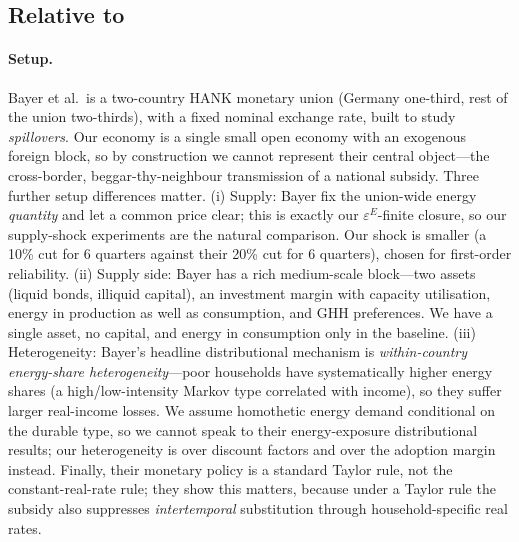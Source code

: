 \documentclass[11pt,a4paper]{article}
\begin{document}
\subsection{Relative to \citet{Bayer2026}}

\paragraph{Setup.} Bayer et al.\ is a two-country HANK monetary union (Germany
one-third, rest of the union two-thirds), with a fixed nominal exchange rate,
built to study \emph{spillovers}. Our economy is a single small open economy
with an exogenous foreign block, so by construction we cannot represent their
central object---the cross-border, beggar-thy-neighbour transmission of a
national subsidy. Three further setup differences matter. (i) Supply: Bayer
fix the union-wide energy \emph{quantity} and let a common price clear; this is
exactly our $\varepsilon^E$-finite closure, so our supply-shock experiments are
the natural comparison. Our shock is smaller (a 10\% cut for 6 quarters against
their 20\% cut for 6 quarters), chosen for first-order reliability. (ii) Supply
side: Bayer has a rich medium-scale block---two assets (liquid bonds, illiquid
capital), an investment margin with capacity utilisation, energy in production
as well as consumption, and GHH preferences. We have a single asset, no
capital, and energy in consumption only in the baseline. (iii) Heterogeneity:
Bayer's headline distributional mechanism is \emph{within-country
energy-share heterogeneity}---poor households have systematically higher energy
shares (a high/low-intensity Markov type correlated with income), so they
suffer larger real-income losses. We assume homothetic energy demand
conditional on the durable type, so we cannot speak to their energy-exposure
distributional results; our heterogeneity is over discount factors and over the
adoption margin instead. Finally, their monetary policy is a standard Taylor
rule, not the constant-real-rate rule; they show this matters, because under a
Taylor rule the subsidy also suppresses \emph{intertemporal} substitution
through household-specific real rates.
\end{document}
